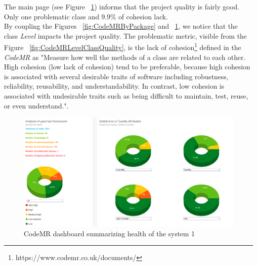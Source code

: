 \documentclass[]{article}
\begin{document}
The main page (see Figure ~\ref{fig:CodeMRDashboard}) informs that the project quality is fairly good. Only one problematic class and $9.9\%$ of cohesion lack. \\

By coupling the Figures ~\ref{fig:CodeMRByPackage} and ~\ref{fig:CodeMRDashboard}, we notice that the class \textit{Level} impacts the project quality. The problematic metric, visible from the Figure ~\ref{fig:CodeMRLevelClassQuality}, is the lack of cohesion\footnote{https://www.codemr.co.uk/documents/} defined in the \textit{CodeMR} as "Measure how well the methods of a class are related to each other. High cohesion (low lack of cohesion) tend to be preferable, because high cohesion is associated with several desirable traits of software including robustness, reliability, reusability, and understandability. In contrast, low cohesion is associated with undesirable traits such as being difficult to maintain, test, reuse, or even understand.".

\begin{figure}
    \centering
    \includegraphics[width=\linewidth]{imgs/CodeMRDashboard.PNG}
    \caption{CodeMR dashboard summarizing health of the system 1}
    \label{fig:CodeMRDashboard}
\end{figure}
\end{document}

